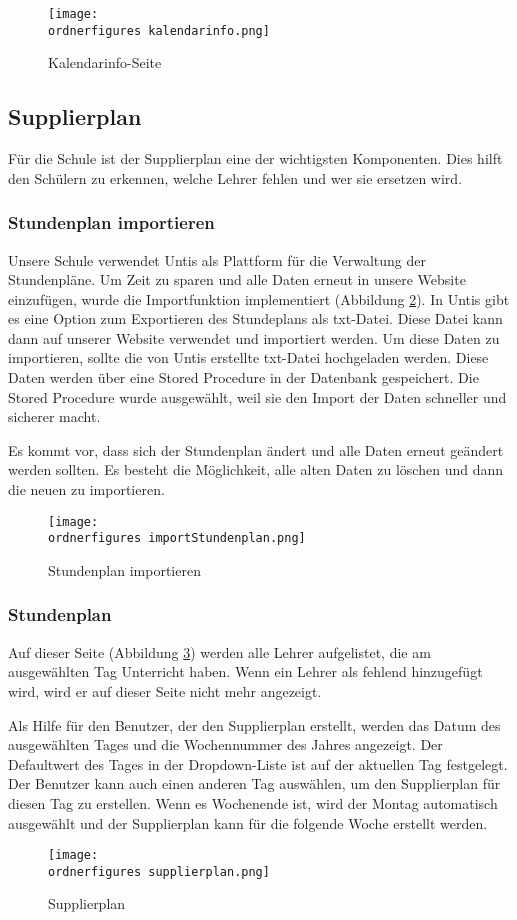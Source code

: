 \begin{figure}[H]
	\centering
	\texttt{[image: \\ordnerfigures kalendarinfo.png]}
	\caption{Kalendarinfo-Seite}
	\label{fi:kalendar}
\end{figure}

\subsection{Supplierplan}
Für die Schule ist der Supplierplan eine der wichtigsten Komponenten. Dies hilft den Schülern zu erkennen, welche Lehrer fehlen und wer sie ersetzen wird.

\subsubsection{Stundenplan importieren}
Unsere Schule verwendet Untis als Plattform für die Verwaltung der Stundenpl\"ane. Um Zeit zu sparen und alle Daten erneut in unsere Website einzufügen, wurde die Importfunktion implementiert (Abbildung \ref{fi:import}). In Untis gibt es eine Option zum Exportieren des Stundeplans als txt-Datei. Diese Datei kann dann auf unserer Website verwendet und importiert werden.
Um diese Daten zu importieren, sollte die von Untis erstellte txt-Datei hochgeladen werden. Diese Daten werden über eine Stored Procedure in der Datenbank gespeichert. Die Stored Procedure wurde ausgewählt, weil sie den Import der Daten schneller und sicherer macht.

Es kommt vor, dass sich der Stundenplan ändert und alle Daten erneut geändert werden sollten. Es besteht die Möglichkeit, alle alten Daten zu löschen und dann die neuen zu importieren.
\begin{figure}[H]
	\centering
	\texttt{[image: \\ordnerfigures importStundenplan.png]}
	\caption{Stundenplan importieren}
	\label{fi:import}
\end{figure}

\subsubsection{Stundenplan }

Auf dieser Seite (Abbildung \ref{fi:supplierplan}) werden alle Lehrer aufgelistet, die am ausgewählten Tag Unterricht haben. Wenn ein Lehrer als fehlend hinzugefügt wird, wird er auf dieser Seite nicht mehr angezeigt.

Als Hilfe für den Benutzer, der den Supplierplan erstellt, werden das Datum des ausgewählten Tages und die Wochennummer des Jahres angezeigt.
Der Defaultwert des Tages in der Dropdown-Liste ist auf der aktuellen Tag festgelegt. Der Benutzer kann auch einen anderen Tag auswählen, um den Supplierplan für diesen Tag zu erstellen. Wenn es Wochenende ist, wird der Montag automatisch ausgewählt und der Supplierplan kann für die folgende Woche erstellt werden.
\begin{figure}[H]
	\centering
	\texttt{[image: \\ordnerfigures supplierplan.png]}
	\caption{Supplierplan}
	\label{fi:supplierplan}
\end{figure}

